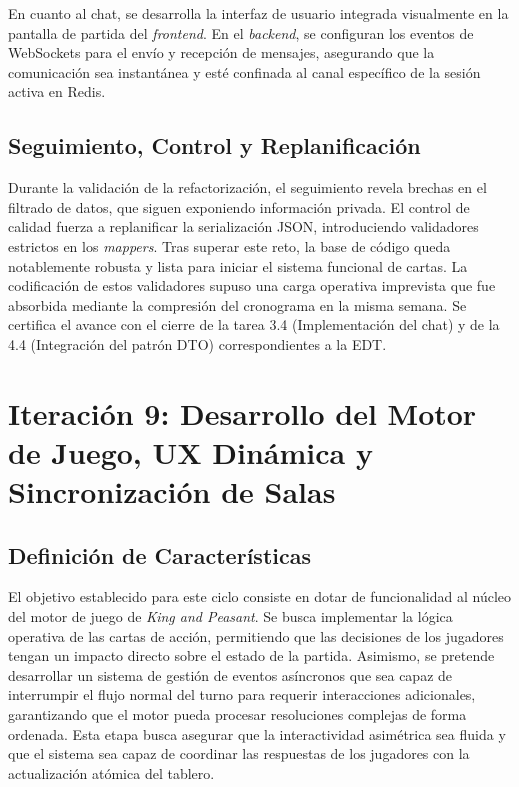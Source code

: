 En cuanto al chat, se desarrolla la interfaz de usuario integrada visualmente en la pantalla de partida del \textit{frontend}. En el \textit{backend}, se configuran los eventos de WebSockets para el envío y recepción de mensajes, asegurando que la comunicación sea instantánea y esté confinada al canal específico de la sesión activa en Redis.

\section{Seguimiento, Control y Replanificación}
Durante la validación de la refactorización, el seguimiento revela brechas en el filtrado de datos, que siguen exponiendo información privada. El control de calidad fuerza a replanificar la serialización JSON, introduciendo validadores estrictos en los \textit{mappers}. Tras superar este reto, la base de código queda notablemente robusta y lista para iniciar el sistema funcional de cartas. La codificación de estos validadores supuso una carga operativa imprevista que fue absorbida mediante la compresión del cronograma en la misma semana. Se certifica el avance con el cierre de la tarea 3.4 (Implementación del chat) y de la 4.4 (Integración del patrón DTO) correspondientes a la EDT.


\chapter[Iteración 9: Motor de Juego y UX Dinámica]{Iteración 9: Desarrollo del Motor de Juego, UX Dinámica y Sincronización de Salas}

\section{Definición de Características}
El objetivo establecido para este ciclo consiste en dotar de funcionalidad al núcleo del motor de juego de \textit{King and Peasant}. Se busca implementar la lógica operativa de las cartas de acción, permitiendo que las decisiones de los jugadores tengan un impacto directo sobre el estado de la partida. Asimismo, se pretende desarrollar un sistema de gestión de eventos asíncronos que sea capaz de interrumpir el flujo normal del turno para requerir interacciones adicionales, garantizando que el motor pueda procesar resoluciones complejas de forma ordenada. Esta etapa busca asegurar que la interactividad asimétrica sea fluida y que el sistema sea capaz de coordinar las respuestas de los jugadores con la actualización atómica del tablero.

